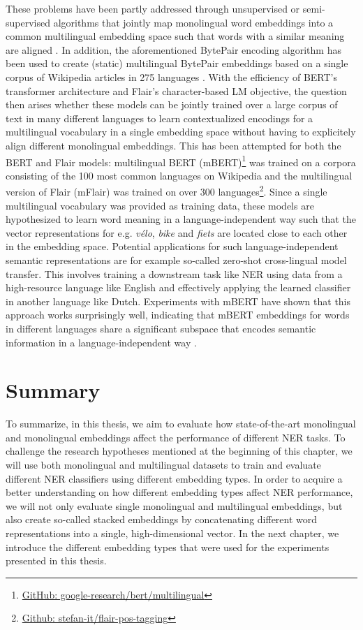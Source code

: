 \documentclass[12pt,a4paper,]{book}
\begin{document}
These problems have been partly addressed through unsupervised or semi-supervised algorithms that jointly map monolingual word embeddings into a common multilingual embedding space such that words with a similar meaning are aligned \citep{artetxe2018, lample2018}. In addition, the aforementioned BytePair encoding algorithm has been used to create (static) multilingual BytePair embeddings based on a single corpus of Wikipedia articles in 275 languages \citep{heinzerling2017}. With the efficiency of BERT's transformer architecture and Flair's character-based LM objective, the question then arises whether these models can be jointly trained over a large corpus of text in many different languages to learn contextualized encodings for a multilingual vocabulary in a single embedding space without having to explicitely align different monolingual embeddings. This has been attempted for both the BERT and Flair models: multilingual BERT (mBERT)\footnote{\href{https://github.com/google-research/bert/blob/master/multilingual.md}{GitHub: google-research/bert/multilingual}} was trained on a corpora consisting of the 100 most common languages on Wikipedia and the multilingual version of Flair (mFlair) was trained on over 300 languages\footnote{\href{https://github.com/stefan-it/flair-pos-tagging}{Github: stefan-it/flair-pos-tagging}}. Since a single multilingual vocabulary was provided as training data, these models are hypothesized to learn word meaning in a language-independent way such that the vector representations for e.g. \emph{vélo}, \emph{bike} and \emph{fiets} are located close to each other in the embedding space. Potential applications for such language-independent semantic representations are for example so-called zero-shot cross-lingual model transfer. This involves training a downstream task like NER using data from a high-resource language like English and effectively applying the learned classifier in another language like Dutch. Experiments with mBERT have shown that this approach works surprisingly well, indicating that mBERT embeddings for words in different languages share a significant subspace that encodes semantic information in a language-independent way \citep{pires2019}.

\hypertarget{summary}{%
\section{Summary}\label{summary}}

To summarize, in this thesis, we aim to evaluate how state-of-the-art monolingual and monolingual embeddings affect the performance of different NER tasks. To challenge the research hypotheses mentioned at the beginning of this chapter, we will use both monolingual and multilingual datasets to train and evaluate different NER classifiers using different embedding types. In order to acquire a better understanding on how different embedding types affect NER performance, we will not only evaluate single monolingual and multilingual embeddings, but also create so-called stacked embeddings by concatenating different word representations into a single, high-dimensional vector. In the next chapter, we introduce the different embedding types that were used for the experiments presented in this thesis.
\end{document}
